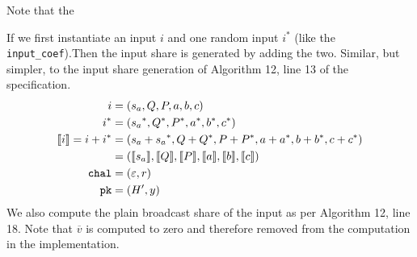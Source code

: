 \documentclass[11pt]{report}
\theoremstyle{definition}
\theoremstyle{plain}
\begin{document}
Note that the

If we first instantiate an input $i$ and one random input $i^*$ (like the \texttt{input\_coef}).Then the input share is generated by adding the two. Similar, but simpler, to the input share generation of Algorithm 12, line 13 of the specification.
\begin{align*}
  i                & = (s_a, Q, P, a,b,c)                                             \\
  i^*              & = ({s_a}^*, Q^*, P^*, a^*,b^*,c^*)                               \\
  \llbracket i \rrbracket = i + i^* & = ({s_a} + {s_a}^*, Q + Q^*, P + P^*, a + a^*, b + b^*, c + c^*) \\
                   & = (\llbracket s_a \rrbracket, \llbracket Q \rrbracket, \llbracket P \rrbracket, \llbracket a \rrbracket, \llbracket b \rrbracket, \llbracket c \rrbracket)             \\
  \texttt{chal}    & = (\varepsilon, r)                                               \\
  \texttt{pk}      & = (H', y)
\end{align*}
We also compute the plain broadcast share of the input as per Algorithm 12, line 18. Note that $\overline{v}$ is computed to zero and therefore removed from the computation in the implementation.
\end{document}
